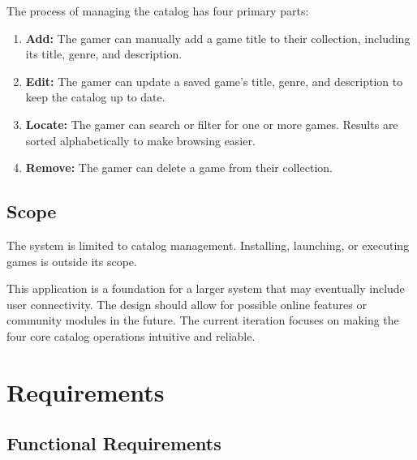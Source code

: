 \documentclass[11pt,a4paper]{report}
\begin{document}
The process of managing the catalog has four primary parts:
\begin{enumerate}
      \item \textbf{Add:} The gamer can manually add a game title to their
            collection, including its title, genre, and description.
      \item \textbf{Edit:} The gamer can update a saved game's title, genre,
            and description to keep the catalog up to date.
      \item \textbf{Locate:} The gamer can search or filter for one or more
            games. Results are sorted alphabetically to make browsing easier.
      \item \textbf{Remove:} The gamer can delete a game from their collection.
\end{enumerate}

\section{Scope}

The system is limited to catalog management. Installing, launching, or
executing games is outside its scope.

This application is a foundation for a larger system that may eventually
include user connectivity. The design should allow for possible online
features or community modules in the future. The current iteration focuses
on making the four core catalog operations intuitive and reliable.

\chapter{Requirements}

\section{Functional Requirements}
\end{document}
